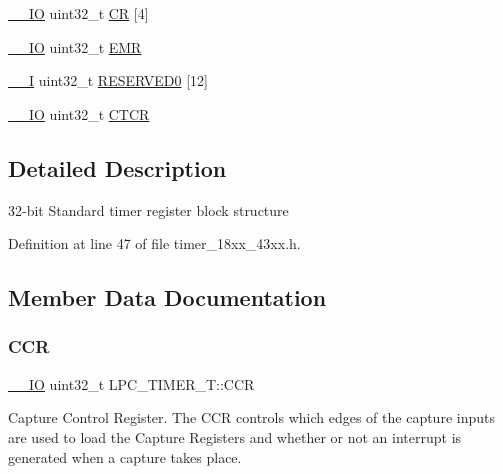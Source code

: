 \begin{DoxyCompactItemize}
\item 
\hyperlink{core__sc300_8h_aec43007d9998a0a0e01faede4133d6be}{\+\_\+\+\_\+\+IO} uint32\+\_\+t \hyperlink{struct_l_p_c___t_i_m_e_r___t_aa352dc65884c0a7b8888736a90a4bb7b}{CR} \mbox{[}4\mbox{]}
\item 
\hyperlink{core__sc300_8h_aec43007d9998a0a0e01faede4133d6be}{\+\_\+\+\_\+\+IO} uint32\+\_\+t \hyperlink{struct_l_p_c___t_i_m_e_r___t_a92df4dc0b947774e8cf040b5c2c2ae30}{E\+MR}
\item 
\hyperlink{core__sc300_8h_af63697ed9952cc71e1225efe205f6cd3}{\+\_\+\+\_\+I} uint32\+\_\+t \hyperlink{struct_l_p_c___t_i_m_e_r___t_ac55f208ad800371ff9db0ba9f49ec716}{R\+E\+S\+E\+R\+V\+E\+D0} \mbox{[}12\mbox{]}
\item 
\hyperlink{core__sc300_8h_aec43007d9998a0a0e01faede4133d6be}{\+\_\+\+\_\+\+IO} uint32\+\_\+t \hyperlink{struct_l_p_c___t_i_m_e_r___t_a8bee15636f5bce5c6d3f3fcd4d8cf513}{C\+T\+CR}
\end{DoxyCompactItemize}


\subsection{Detailed Description}
32-\/bit Standard timer register block structure 

Definition at line 47 of file timer\+\_\+18xx\+\_\+43xx.\+h.



\subsection{Member Data Documentation}
\mbox{\label{struct_l_p_c___t_i_m_e_r___t_ae97a68e845ea92e8c617bbdf1d867e48}} 
\subsubsection{\texorpdfstring{C\+CR}{CCR}}
{\footnotesize\ttfamily \hyperlink{core__sc300_8h_aec43007d9998a0a0e01faede4133d6be}{\+\_\+\+\_\+\+IO} uint32\+\_\+t L\+P\+C\+\_\+\+T\+I\+M\+E\+R\+\_\+\+T\+::\+C\+CR}

Capture Control Register. The C\+CR controls which edges of the capture inputs are used to load the Capture Registers and whether or not an interrupt is generated when a capture takes place. 

